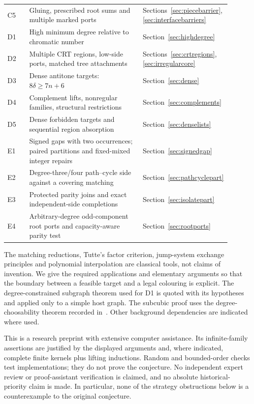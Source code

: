 \begin{longtable}{>{\raggedright\arraybackslash}p{0.10\linewidth}>{\raggedright\arraybackslash}p{0.53\linewidth}>{\raggedright\arraybackslash}p{0.27\linewidth}}
C5&Gluing, prescribed root sums and multiple marked ports&Sections~\ref{sec:piecebarrier}, \ref{sec:interfacebarriers}\\
D1&High minimum degree relative to chromatic number&Section~\ref{sec:highdegree}\\
D2&Multiple CRT regions, low-side ports, matched tree attachments&Sections~\ref{sec:crtregions}, \ref{sec:irregularcore}\\
D3&Dense antitone targets: $8\delta\ge7n+6$&Section~\ref{sec:dense}\\
D4&Complement lifts, nonregular families, structural restrictions&Section~\ref{sec:complements}\\
D5&Dense forbidden targets and sequential region absorption&Section~\ref{sec:denselists}\\
E1&Signed gaps with two occurrences; paired partitions and fixed-mixed integer repairs&Section~\ref{sec:signedgap}\\
E2&Degree-three/four path--cycle side against a covering matching&Section~\ref{sec:pathcyclepart}\\
E3&Protected parity joins and exact independent-side completions&Section~\ref{sec:isolatepart}\\
E4&Arbitrary-degree odd-component root ports and capacity-aware parity test&Section~\ref{sec:rootports}\\
\bottomrule
\end{longtable}

The matching reductions, Tutte's factor criterion, jump-system exchange
principles and polynomial interpolation are classical tools, not claims
of invention. We give the required applications and elementary arguments
so that the boundary between a feasible target and a legal colouring is
explicit. The degree-constrained subgraph theorem used for D1 is quoted
with its hypotheses and applied only to a simple host graph. The
subcubic proof uses the degree-choosability theorem recorded
in~\cite{CR17}. Other background dependencies are indicated where used.

This is a research preprint with extensive computer assistance. Its
infinite-family assertions are justified by the displayed arguments and,
where indicated, complete finite kernels plus lifting inductions.
Random and bounded-order checks test implementations; they do not prove
the conjecture. No independent expert review or proof-assistant
verification is claimed, and no absolute historical-priority claim is
made. In particular, none of the strategy obstructions below is a
counterexample to the original conjecture.
